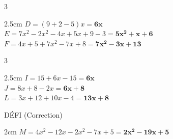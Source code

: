 \documentclass[a4paper]{book}
\begin{document}
{    %
    \begin{exerciceNote}{3}
        \begin{ZoneReponse}{2.5cm}
            $D = (9 + 2 - 5)x = \mathbf{6x}$ \\
            $E = 7x^2 - 2x^2 - 4x + 5x + 9 - 3 = \mathbf{5x^2 + x + 6}$ \\
            $F = 4x + 5 + 7x^2 - 7 x + 8 = \mathbf{7x^2 - 3x + 13}$
        \end{ZoneReponse}
    \end{exerciceNote}
        
    \begin{exerciceNote}{3}
        \begin{ZoneReponse}{2.5cm}
            $I = 15 + 6x - 15 = \mathbf{6x}$ \\
            $J = 8x + 8 - 2x = \mathbf{6x + 8}$ \\
            $L = 3x + 12 + 10x - 4 = \mathbf{13x + 8}$
        \end{ZoneReponse}
    \end{exerciceNote}
    
    \begin{boiteTitre}{DÉFI (Correction)}
        \begin{ZoneReponse}{2cm}
            $M = 4x^2 - 12x - 2x^2 - 7x + 5 = \mathbf{2x^2 - 19x + 5}$
        \end{ZoneReponse}
    \end{boiteTitre}

    
}
\end{document}
